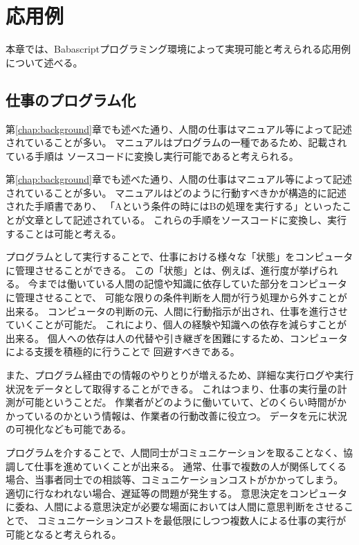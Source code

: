 \chapter{応用例}\label{chap:application}

本章では、Babascriptプログラミング環境によって実現可能と考えられる応用例について述べる。

\newpage

\section{仕事のプログラム化}\label{ux4ed5ux4e8bux306eux30d7ux30edux30b0ux30e9ux30e0ux5316}

第\ref{chap:background}章でも述べた通り、人間の仕事はマニュアル等によって記述されていることが多い。
マニュアルはプログラムの一種であるため、記載されている手順は
ソースコードに変換し実行可能であると考えられる。

第\ref{chap:background}章でも述べた通り、人間の仕事はマニュアル等によって記述されていることが多い。
マニュアルはどのように行動すべきかが構造的に記述された手順書であり、
「Aという条件の時にはBの処理を実行する」といったことが文章として記述されている。
これらの手順をソースコードに変換し、実行することは可能と考える。

プログラムとして実行することで、仕事における様々な「状態」をコンピュータに管理させることができる。
この「状態」とは、例えば、進行度が挙げられる。
今までは働いている人間の記憶や知識に依存していた部分をコンピュータに管理させることで、
可能な限りの条件判断を人間が行う処理から外すことが出来る。
コンピュータの判断の元、人間に行動指示が出され、仕事を進行させていくことが可能だ。
これにより、個人の経験や知識への依存を減らすことが出来る。
個人への依存は人の代替や引き継ぎを困難にするため、コンピュータによる支援を積極的に行うことで
回避すべきである。

また、プログラム経由での情報のやりとりが増えるため、詳細な実行ログや実行状況をデータとして取得することができる。
これはつまり、仕事の実行量の計測が可能ということだ。
作業者がどのように働いていて、どのくらい時間がかかっているのかという情報は、作業者の行動改善に役立つ。
データを元に状況の可視化なども可能である。

プログラムを介することで、人間同士がコミュニケーションを取ることなく、協調して仕事を進めていくことが出来る。
通常、仕事で複数の人が関係してくる場合、当事者同士での相談等、コミュニケーションコストがかかってしまう。
適切に行なわれない場合、遅延等の問題が発生する。
意思決定をコンピュータに委ね、人間による意思決定が必要な場面においては人間に意思判断をさせることで、
コミュニケーションコストを最低限にしつつ複数人による仕事の実行が可能となると考えられる。

